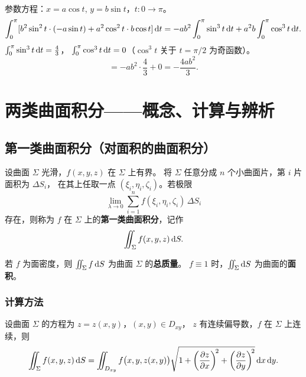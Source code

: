 \documentclass{article}
\begin{document}
\begin{solution}
  参数方程：$x = a\cos t$, $y = b\sin t$，$t: 0 \to \pi$。
  \[
    \int_0^\pi [b^2\sin^2 t\cdot(-a\sin t) + a^2\cos^2 t\cdot b\cos t]\,\mathrm{d} t
    = -ab^2\int_0^\pi\sin^3 t\,\mathrm{d} t + a^2 b\int_0^\pi\cos^3 t\,\mathrm{d} t.
  \]
  $\int_0^\pi\sin^3 t\,\mathrm{d} t = \frac{4}{3}$，
  $\int_0^\pi\cos^3 t\,\mathrm{d} t = 0$（$\cos^3 t$ 关于 $t=\pi/2$ 为奇函数）。
  \[
    = -ab^2\cdot\frac{4}{3} + 0 = -\frac{4ab^2}{3}.
  \]
\end{solution}


\section{两类曲面积分——概念、计算与辨析}

\subsection{第一类曲面积分（对面积的曲面积分）}

\begin{definition}[第一类曲面积分]
  设曲面 $\Sigma$ 光滑，$f(x,y,z)$ 在 $\Sigma$ 上有界。
  将 $\Sigma$ 任意分成 $n$ 个小曲面片，第 $i$ 片面积为 $\Delta S_i$，
  在其上任取一点 $(\xi_i, \eta_i, \zeta_i)$。若极限
  \[
    \lim_{\lambda \to 0} \sum_{i=1}^{n} f(\xi_i, \eta_i, \zeta_i) \,\Delta S_i
  \]
  存在，则称为 $f$ 在 $\Sigma$ 上的\textbf{第一类曲面积分}，记作
  \[
    \iint_\Sigma f(x,y,z) \,\mathrm{d} S.
  \]
\end{definition}

\begin{remark}[物理意义]
  若 $f$ 为面密度，则 $\iint_\Sigma f \,\mathrm{d} S$ 为曲面 $\Sigma$ 的\textbf{总质量}。
  $f \equiv 1$ 时，$\iint_\Sigma \mathrm{d} S$ 为曲面的\textbf{面积}。
\end{remark}

\subsubsection*{计算方法}

\begin{theorem}
  设曲面 $\Sigma$ 的方程为 $z = z(x,y)$，$(x,y) \in D_{xy}$，
  $z$ 有连续偏导数，$f$ 在 $\Sigma$ 上连续，则
  \[
    \iint_\Sigma f(x,y,z) \,\mathrm{d} S
    = \iint_{D_{xy}} f\bigl(x,y,z(x,y)\bigr)
    \sqrt{1 + \left(\frac{\partial z}{\partial x}\right)^{\!2} +
    \left(\frac{\partial z}{\partial y}\right)^{\!2}} \,\mathrm{d} x\,\mathrm{d} y.
  \]
\end{theorem}
\end{document}
